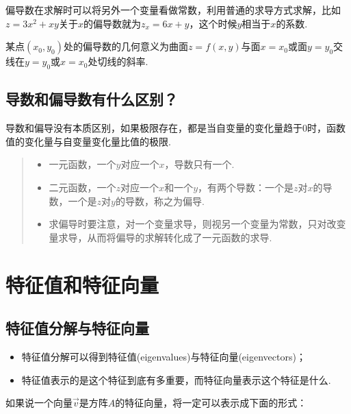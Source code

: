 偏导数在求解时可以将另外一个变量看做常数，利用普通的求导方式求解，比如\(z=3x^2+xy\)关于\(x\)的偏导数就为\(z_x=6x+y\)，这个时候\(y\)相当于\(x\)的系数.

某点\((x_0,y_0)\)处的偏导数的几何意义为曲面\(z=f(x,y)\)与面\(x=x_0\)或面\(y=y_0\)交线在\(y=y_0\)或\(x=x_0\)处切线的斜率.

\subsection{导数和偏导数有什么区别？}\label{ux5bfcux6570ux548cux504fux5bfcux6570ux6709ux4ec0ux4e48ux533aux522b}

导数和偏导没有本质区别，如果极限存在，都是当自变量的变化量趋于0时，函数值的变化量与自变量变化量比值的极限.

\begin{quote}
\begin{itemize}
 
\item
  一元函数，一个\(y\)对应一个\(x\)，导数只有一个.\\
\item
  二元函数，一个\(z\)对应一个\(x\)和一个\(y\)，有两个导数：一个是\(z\)对\(x\)的导数，一个是\(z\)对\(y\)的导数，称之为偏导.\\
\item
  求偏导时要注意，对一个变量求导，则视另一个变量为常数，只对改变量求导，从而将偏导的求解转化成了一元函数的求导.
\end{itemize}
\end{quote}

\section{特征值和特征向量}\label{ux7279ux5f81ux503cux548cux7279ux5f81ux5411ux91cf}

\subsection{特征值分解与特征向量}\label{ux7279ux5f81ux503cux5206ux89e3ux4e0eux7279ux5f81ux5411ux91cf}

\begin{itemize}
\item
  特征值分解可以得到特征值(eigenvalues)与特征向量(eigenvectors)；
\item
  特征值表示的是这个特征到底有多重要，而特征向量表示这个特征是什么.
\end{itemize}

如果说一个向量\(\vec{v}\)是方阵\(A\)的特征向量，将一定可以表示成下面的形式：

